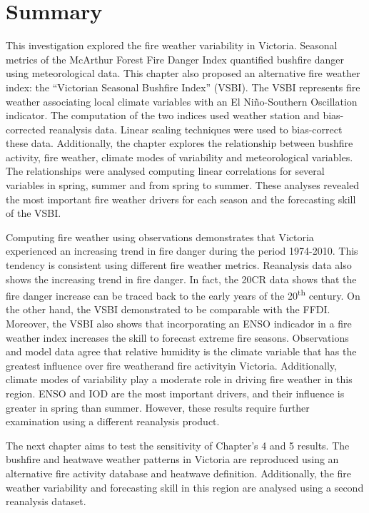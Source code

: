 \section{Summary}

This investigation explored the fire weather variability in Victoria.
Seasonal metrics of the McArthur Forest Fire Danger Index quantified
bushfire danger using meteorological data. This chapter also proposed
an alternative fire weather index: the \textquotedblleft Victorian
Seasonal Bushfire Index\textquotedblright{} (VSBI). The VSBI represents
fire weather associating local climate variables with an El Ni\~no-Southern
Oscillation indicator. The computation of the two indices used weather
station and bias-corrected reanalysis data. Linear scaling techniques
were used to bias-correct these data. Additionally, the chapter explores
the relationship between bushfire activity, fire weather, climate
modes of variability and meteorological variables. The relationships
were analysed computing linear correlations for several variables
in spring, summer and from spring to summer. These analyses revealed
the most important fire weather drivers for each season and the forecasting
skill of the VSBI.

Computing fire weather using observations demonstrates that Victoria
experienced an increasing trend in fire danger during the period 1974-2010.
This tendency is consistent using different fire weather metrics.
Reanalysis data also shows the increasing trend in fire danger. In
fact, the 20CR data shows that the fire danger increase can be traced
back to the early years of the 20\textsuperscript{th} century. On
the other hand, the VSBI demonstrated to be comparable with the FFDI.
Moreover, the VSBI also shows that incorporating an ENSO indicador
in a fire weather index increases the skill to forecast extreme fire
seasons. Observations and model data agree that relative humidity
is the climate variable that has the greatest influence over fire
weather\textemdash and fire activity\textemdash in Victoria. Additionally,
climate modes of variability play a moderate role in driving fire
weather in this region. ENSO and IOD are the most important drivers,
and their influence is greater in spring than summer. However, these
results require further examination using a different reanalysis product.

The next chapter aims to test the sensitivity of Chapter's 4 and 5
results. The bushfire and heatwave weather patterns in Victoria are
reproduced using an alternative fire activity database and heatwave
definition. Additionally, the fire weather variability and forecasting
skill in this region are analysed using a second reanalysis dataset. 

